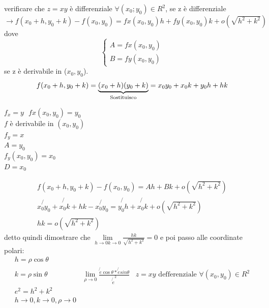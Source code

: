 \begin{esempio}
  verificare che $z=xy$ è differenziale $\forall (x_0;y_0)\in R^2$, se z è differenziale\\
  $\to f(x_0+h,y_0+k) - f(x_0,y_0)=fx(x_0,y_0)h+fy(x_0,y_0)k+o(\sqrt{h^2+k^2})$ dove
  \begin{equation*}
    \begin{cases}
      A=fx(x_0,y_0)\\
      B=fy(x_0,y_0)
    \end{cases}
  \end{equation*}
  se z è derivabile in ($x_0,y_0$).
  \begin{equation*}
    f(x_0+h,y_0+k) =\underbrace{(x_0+h)(y_0+k)}_{\text{\shortstack{Sostituisco}}}=x_0y_0+x_0k+y_0h+hk
  \end{equation*}
  \begin{multicols}{3}
    $f_x=y\text{ }fx(x_0,y_0)=y_0$\\
    $f$ è derivabile in $(x_0,y_0)$\\
    $f_y=x$\\
    $A=y_0$\\
    $f_y(x_0,y_0)=x_0$\\
    $D=x_0$
  \end{multicols}
  \begin{equation*}
    \begin{matrix}
      f(x_0+h,y_0+k) - f(x_0,y_0)=Ah+Bk+o(\sqrt{h^2+k^2})\\
      \not{x_0y_0}+\not{x_0k}+hk-\not{x_0y_0}=\not{y_0h}+\not{x_0k}+o(\sqrt{h^2+k^2})\\
      hk=o(\sqrt{h^2+k^2})
    \end{matrix}
  \end{equation*}
  detto quindi dimostrare che $\lim\limits_{h\to 0 k\to 0}\frac{hk}{\sqrt{h^2+k^2}}=0$
  e poi passo alle coordinate polari:
  \begin{equation*}
    \begin{matrix}
      h=\rho \cos \theta\\
      k=\rho \sin \theta & \lim\limits_{\rho\to 0} \frac{\not{e} \cos\theta* \not{e} sin\theta}{\not{e}^2}& z=xy \text{ defferenziale } \forall (x_0,y_0)\in R^2\\
      e^2=h^2+k^2\\
      h\to0,k\to 0,\rho \to 0\\
    \end{matrix}
  \end{equation*}  
\end{esempio}
